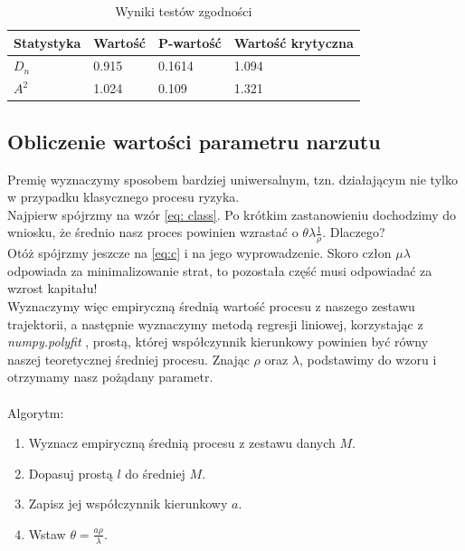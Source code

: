 \documentclass{article}
\theoremstyle{break}
\numberwithin{equation}{subsection}
\numberwithin{figure}{section}
\begin{document}
\begin{table}[H]
\begin{center}
	\begin{tabular}{|l|l|l|l|}
		\hline
		\rowcolor[HTML]{EFEFEF} 
		Statystyka & Wartość & P-wartość & Wartość krytyczna \\ \hline
		$D_n$      & 0.915   & 0.1614    & 1.094             \\ \hline
		$A^2$      & 1.024   & 0.109     & 1.321             \\ \hline
		
	\end{tabular}
\caption{Wyniki testów zgodności}
\label{table: testy}
\end{center}
\end{table}

\subsection{Obliczenie wartości parametru narzutu}

Premię wyznaczymy sposobem bardziej uniwersalnym, tzn. działającym nie tylko w przypadku klasycznego procesu ryzyka. \\
Najpierw spójrzmy na wzór \eqref{eq: class}. Po krótkim zastanowieniu dochodzimy do wniosku, że średnio nasz proces powinien wzrastać o $\theta \lambda\frac{1}{\rho} $. Dlaczego?\\
Otóż spójrzmy jeszcze na \eqref{eq:c} i na jego wyprowadzenie. Skoro człon $\mu \lambda$ odpowiada za minimalizowanie strat, to pozostała część musi odpowiadać za wzrost kapitału!\\
Wyznaczymy więc empiryczną średnią wartość procesu z naszego zestawu trajektorii, a następnie wyznaczymy metodą regresji liniowej, korzystając z \emph{numpy.polyfit }\cite{polyfit}, prostą, której współczynnik kierunkowy powinien być równy naszej teoretycznej średniej procesu.
Znając $\rho$ oraz $\lambda$, podstawimy do wzoru i otrzymamy nasz pożądany parametr.\\\\

Algorytm:

\begin{enumerate}
\item Wyznacz empiryczną średnią procesu z zestawu danych $M$.
\item Dopasuj prostą $l$ do średniej $M$.
\item Zapisz jej współczynnik kierunkowy $a$.
\item Wstaw $\theta = \frac{a \rho}{\lambda}$.
\end{enumerate}
\end{document}
